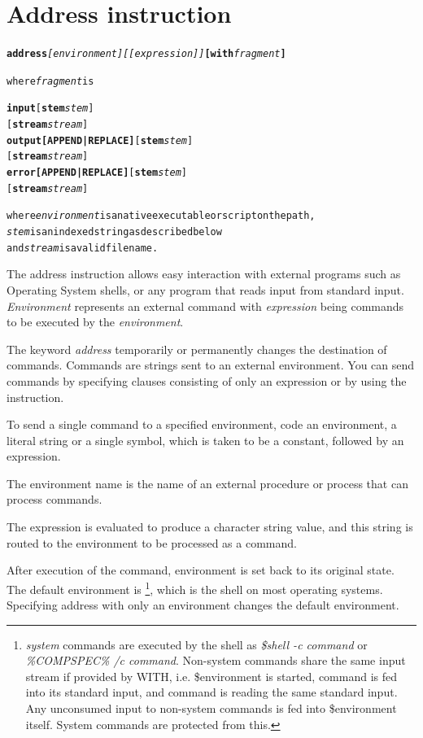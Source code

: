 \section{Address instruction}\label{refaddress}
\begin{shaded}
  \begin{alltt}
  \textbf{address} \emph{[environment]} \emph{[[expression]]} \textbf{[with} \emph{fragment}\textbf{]}

  where \emph{fragment} is
  
  \textbf{input} [\textbf{stem} \emph{stem}]
        [\textbf{stream} \emph{stream}]
	  \textbf{output} \textbf{[APPEND|REPLACE]} [\textbf{stem} \emph{stem}]
                          [\textbf{stream} \emph{stream}]
	  \textbf{error} \textbf{[APPEND|REPLACE]} [\textbf{stem} \emph{stem}]
                         [\textbf{stream} \emph{stream}]
                
where \emph{environment} is a native executable or script on the path,
\emph{stem} is an indexed string as described below
and \emph{stream} is a valid filename.
\end{alltt}

% 
\end{shaded}
The address instruction allows easy interaction with external programs such as Operating System shells, or any program that reads 
input from standard input. \emph{Environment} represents an external command with \emph{expression} being commands to be executed 
by the \emph{environment}. 

The keyword \emph{address} temporarily or permanently changes the destination of commands. Commands are strings sent to an external environment. 
You can send commands by specifying clauses consisting of only an expression or by using the  instruction.

To send a single command to a specified environment, code an
environment, a literal string or a single symbol, which is taken to be
a constant, followed by an expression.

The environment name is the
name of an external procedure or process that can process
commands.

The expression is evaluated to produce a character string
value, and this string is routed to the environment to be processed as
a command.

After execution of the command, environment is set back to
its original state. The default environment is \footnote{
\emph{system} commands are executed by the shell as \emph{\$shell -c command} or \emph{\%COMPSPEC\% /c command}.
Non-system commands share the same input stream if provided by WITH,
i.e. \$environment is started, command is fed into its standard input,
and command is reading the same standard input. Any unconsumed input to non-system commands is fed into
\$environment itself. System commands are protected from this.
}, which is the shell
on most operating systems. Specifying address with only an environment changes the default environment.


